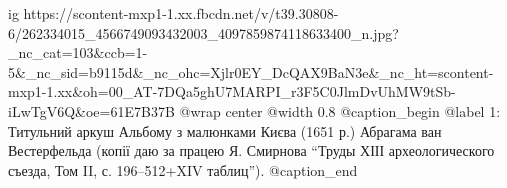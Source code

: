  
 
 
 
 

\ifcmt
  ig https://scontent-mxp1-1.xx.fbcdn.net/v/t39.30808-6/262334015_4566749093432003_4097859874118633400_n.jpg?_nc_cat=103&ccb=1-5&_nc_sid=b9115d&_nc_ohc=Xjlr0EY_DcQAX9BaN3e&_nc_ht=scontent-mxp1-1.xx&oh=00_AT-7DQa5ghU7MARPI_r3F5C0JlmDvUhMW9tSb-iLwTgV6Q&oe=61E7B37B
  @wrap center
  @width 0.8
  @caption_begin
    @label 1:
Титульний аркуш Альбому з малюнками Києва (1651 р.) Абрагама ван Вестерфельда
(копії даю за працею Я. Смирнова \enquote{Труды ХІІІ археологического съезда, Том II, с. 196–512+XIV таблиц}).
  @caption_end
\fi
